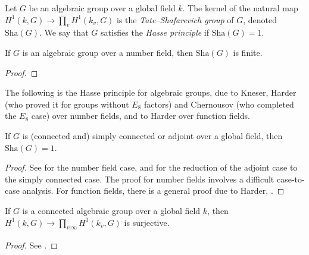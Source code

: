 \begin{definition}
 \label{definition-Sha-Hasse}
Let $G$ be an algebraic group over a global field $k$. The kernel of the natural map $H^1(k,G)\to \prod_v H^1(k_v, G)$ is the {\it Tate--Shafarevich group} of $G$, denoted $\text{Sha}(G)$. We say that $G$ satisfies the {\it Hasse principle} if $\text{Sha}(G)=1$.
\end{definition}



\begin{theorem}
 \label{theorem-Sha-finite}
 If $G$ is an algebraic group over a number field, then $\text{Sha}(G)$ is finite.
\end{theorem}

\begin{proof}
 
\end{proof}


The following is the Hasse principle for algebraic groups, due to Kneser, Harder (who proved it for groups without $E_8$ factors)  and Chernousov (who completed the $E_8$ case) over number fields, and to Harder over function fields.

\begin{theorem}
 \label{theorem-Hasse-principle}
If $G$ is (connected and) simply connected or adjoint over a global field, then $\text{Sha}(G) =1$.
\end{theorem}


\begin{proof}
 See \cite[Theorems 6.6]{Platonov-Rapinchuk} for the number field case, and \cite[Theorems 6.22]{Platonov-Rapinchuk} for the reduction of the adjoint case to the simply connected case. The proof for number fields involves a difficult case-to-case analysis. For function fields, there is a general proof due to Harder, \cite{Harder-Galoiskohomologie}.
\end{proof}

\begin{proposition}
 \label{proposition-H1-surjects}
If $G$ is a connected algebraic group over a global field $k$, then $H^1(k,G) \to \prod_{v|\infty} H^1(k_v, G)$ is surjective.
\end{proposition}


\begin{proof}
 See \cite[Proposition 6.17]{Platonov-Rapinchuk}.
\end{proof}

















